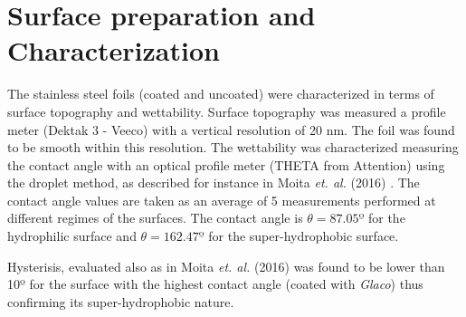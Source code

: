 \section{Surface preparation and Characterization}
\par The stainless steel foils (coated and uncoated) were characterized in terms of surface topography and wettability. Surface topography was measured a profile meter (Dektak 3 - Veeco) with a vertical resolution of 20 nm. The foil was found to be smooth within this resolution. The wettability was characterized measuring the contact angle with an optical profile meter (THETA from Attention) using the droplet method, as described for instance in Moita \textit{et. al.} (2016) \cite{moita2016dynamics}. The contact angle values are taken as an average of 5 measurements performed at different regimes of the surfaces. The contact angle is $\theta = 87.05º$ for the hydrophilic surface and $\theta = 162.47º$ for the super-hydrophobic surface.\\
\par Hysterisis, evaluated also as in Moita \textit{et. al.} (2016) \cite{moita2016dynamics} was found to be lower than 10º for the surface with the highest contact angle (coated with \textit{Glaco}\textregistered) thus confirming its super-hydrophobic nature.